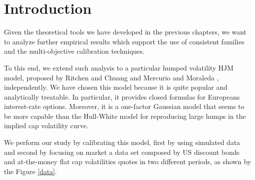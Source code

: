 

\section{Introduction}
Given the theoretical tools we have developed in the previous
chapters, we want to analyze further empirical results which support
the use of consistent families and the multi-objective calibration
techniques.

To this end, we extend such analysis to a particular humped volatility
HJM model, proposed by Ritchen and Chuang \cite{RC:1999} and Mercurio
and Moraleda \cite{MM:2000}, independently. We have chosen this model 
because it is quite popular and analytically treatable. In particular,
it provides closed formulas for Europeans interest-rate options. Moreover, 
it is a one-factor Gaussian model that seems to be more capable than the
Hull-White model for reproducing large humps in the implied cap
volatility curve. 

We perform our study by calibrating this model, first by using
simulated data and second by focusing on market a data set composed by US discount 
bonds and at-the-money flat cap volatilities quotes in two different
periods, as shown by the Figure \ref{data}.

